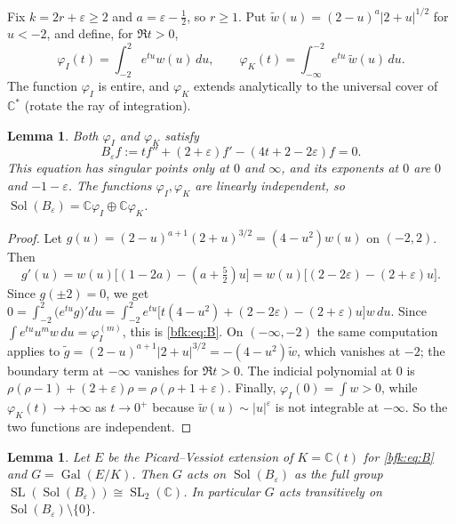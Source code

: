 \documentclass[11pt,a4paper]{article}
\newtheorem{lemma}[theorem]{Lemma}
\theoremstyle{definition}
\theoremstyle{remark}
\numberwithin{equation}{section}
\newcommand{\C}{\mathbb{C}}
\DeclareMathOperator{\Sol}{Sol}
\DeclareMathOperator{\SL}{SL}
\DeclareMathOperator{\Gal}{Gal}
\begin{document}
Fix $k=2r+\varepsilon\ge2$ and $a=\varepsilon-\frac12$, so $r\ge1$. Put $\tilde w(u)=(2-u)^{a}|2+u|^{1/2}$ for $u<-2$, and define, for $\Re t>0$,
\[
\varphi_I(t)=\int_{-2}^{2}e^{tu}w(u)\,du,\qquad \varphi_K(t)=\int_{-\infty}^{-2}e^{tu}\,\tilde w(u)\,du .
\]
The function $\varphi_I$ is entire, and $\varphi_K$ extends analytically to the universal cover of $\C^*$ (rotate the ray of integration).

\begin{lemma}\label{bfk:lem:B}
Both $\varphi_I$ and $\varphi_K$ satisfy
\begin{equation}\label{bfk:eq:B}
B_\varepsilon f:=tf''+(2+\varepsilon)f'-(4t+2-2\varepsilon)f=0 .
\end{equation}
This equation has singular points only at $0$ and $\infty$, and its exponents at $0$ are $0$ and $-1-\varepsilon$. The functions $\varphi_I,\varphi_K$ are linearly independent, so $\Sol(B_\varepsilon)=\C\varphi_I\oplus\C\varphi_K$.
\end{lemma}

\begin{proof}
Let $g(u)=(2-u)^{a+1}(2+u)^{3/2}=(4-u^2)w(u)$ on $(-2,2)$. Then
\[
g'(u)=w(u)\bigl[(1-2a)-(a+\tfrac52)u\bigr]=w(u)\bigl[(2-2\varepsilon)-(2+\varepsilon)u\bigr].
\]
Since $g(\pm2)=0$, we get $0=\int_{-2}^2\bigl(e^{tu}g\bigr)'du=\int_{-2}^2e^{tu}\bigl[t(4-u^2)+(2-2\varepsilon)-(2+\varepsilon)u\bigr]w\,du$. Since $\int e^{tu}u^mw\,du=\varphi_I^{(m)}$, this is \eqref{bfk:eq:B}. On $(-\infty,-2)$ the same computation applies to $\tilde g=(2-u)^{a+1}|2+u|^{3/2}=-(4-u^2)\tilde w$, which vanishes at $-2$; the boundary term at $-\infty$ vanishes for $\Re t>0$. The indicial polynomial at $0$ is $\rho(\rho-1)+(2+\varepsilon)\rho=\rho(\rho+1+\varepsilon)$. Finally, $\varphi_I(0)=\int w>0$, while $\varphi_K(t)\to+\infty$ as $t\to0^+$ because $\tilde w(u)\sim|u|^{\varepsilon}$ is not integrable at $-\infty$. So the two functions are independent.
\end{proof}

\begin{lemma}\label{bfk:lem:galois}
Let $E$ be the Picard--Vessiot extension of $K=\C(t)$ for \eqref{bfk:eq:B} and $G=\Gal(E/K)$. Then $G$ acts on $\Sol(B_\varepsilon)$ as the full group $\SL(\Sol(B_\varepsilon))\cong\SL_2(\C)$. In particular $G$ acts transitively on $\Sol(B_\varepsilon)\setminus\{0\}$.
\end{lemma}
\end{document}
